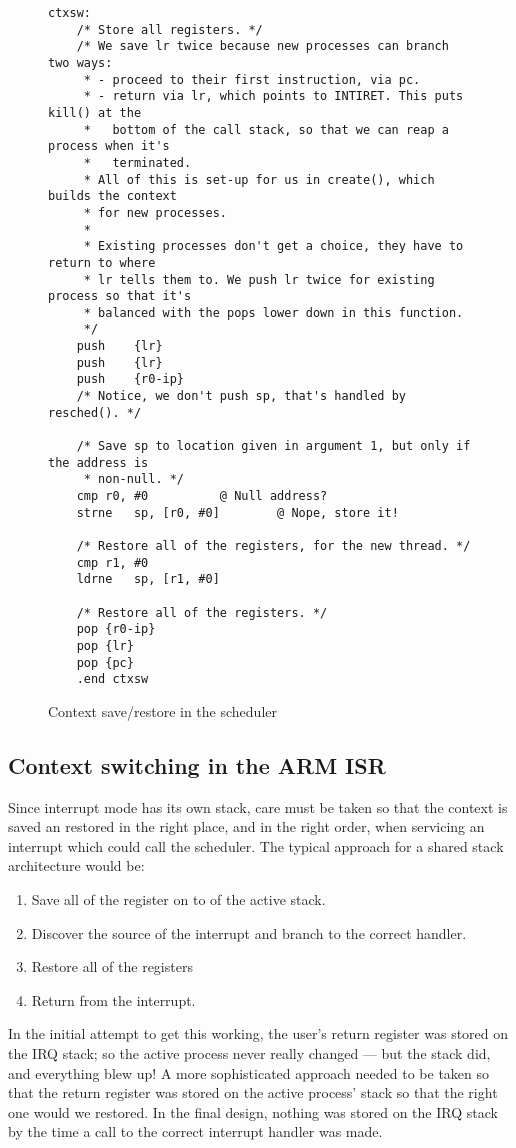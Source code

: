 \documentclass[12pt]{article}
\begin{document}
\begin{figure}
\caption{Context save/restore in the scheduler}
\label{ctxsw}
\small
\begin{verbatim}
ctxsw:
	/* Store all registers. */
	/* We save lr twice because new processes can branch two ways:
	 * - proceed to their first instruction, via pc.
	 * - return via lr, which points to INTIRET. This puts kill() at the
	 *   bottom of the call stack, so that we can reap a process when it's
	 *   terminated.
	 * All of this is set-up for us in create(), which builds the context
	 * for new processes.
	 *
	 * Existing processes don't get a choice, they have to return to where
	 * lr tells them to. We push lr twice for existing process so that it's
	 * balanced with the pops lower down in this function.
	 */
	push	{lr}
	push	{lr}
	push	{r0-ip}
	/* Notice, we don't push sp, that's handled by resched(). */

	/* Save sp to location given in argument 1, but only if the address is
	 * non-null. */
	cmp	r0, #0			@ Null address?
	strne	sp, [r0, #0]		@ Nope, store it!

	/* Restore all of the registers, for the new thread. */
	cmp	r1, #0
	ldrne	sp, [r1, #0]

	/* Restore all of the registers. */
	pop	{r0-ip}
	pop	{lr}
	pop	{pc}
	.end ctxsw
\end{verbatim}
\end{figure}

\subsection{Context switching in the ARM ISR}

Since interrupt mode has its own stack, care must be taken so that the context
is saved an restored in the right place, and in the right order, when servicing
an interrupt which could call the scheduler. The typical approach for a shared
stack architecture would be:

\begin{enumerate}
\item Save all of the register on to of the active stack.
\item Discover the source of the interrupt and branch to the correct handler.
\item Restore all of the registers
\item Return from the interrupt.
\end{enumerate}

In the initial attempt to get this working, the user's return register was
stored on the IRQ stack; so the active process never really changed \---- but
the stack did, and everything blew up! A more sophisticated approach needed to
be taken so that the return register was stored on the active process' stack so
that the right one would we restored. In the final design, nothing was stored
on the IRQ stack by the time a call to the correct interrupt handler was made.
\end{document}
